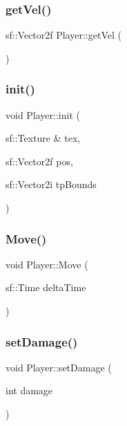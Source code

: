 \mbox{\label{class_player_a0ec9b337a29a388ca7ce6dc9de93ca76}} 
\subsubsection{\texorpdfstring{get\+Vel()}{getVel()}}
{\footnotesize\ttfamily sf\+::\+Vector2f Player\+::get\+Vel (\begin{DoxyParamCaption}{ }\end{DoxyParamCaption})}

\mbox{\label{class_player_ad088063876ac0e5c3eb59fc7c4806929}} 
\subsubsection{\texorpdfstring{init()}{init()}}
{\footnotesize\ttfamily void Player\+::init (\begin{DoxyParamCaption}\item[{sf\+::\+Texture \&}]{tex,  }\item[{sf\+::\+Vector2f}]{pos,  }\item[{sf\+::\+Vector2i}]{tp\+Bounds }\end{DoxyParamCaption})}

\mbox{\label{class_player_aab4ff61041f937e6c3d560863fa46f56}} 
\subsubsection{\texorpdfstring{Move()}{Move()}}
{\footnotesize\ttfamily void Player\+::\+Move (\begin{DoxyParamCaption}\item[{sf\+::\+Time}]{delta\+Time }\end{DoxyParamCaption})}

\mbox{\label{class_player_a065d28e46d0660eff17bad53f2efd622}} 
\subsubsection{\texorpdfstring{set\+Damage()}{setDamage()}}
{\footnotesize\ttfamily void Player\+::set\+Damage (\begin{DoxyParamCaption}\item[{int}]{damage }\end{DoxyParamCaption})}

